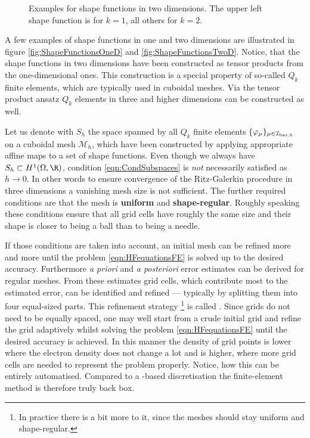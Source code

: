 \begin{figure}
	\centering
	\caption[Examples for shape functions in two dimensions]
	{
		Examples for shape functions in two dimensions.
		The upper left shape function is for $k=1$,
		all others for $k=2$.
	}
	\label{fig:ShapeFunctionsTwoD}
\end{figure}
%
A few examples of shape functions in one and two dimensions are illustrated
in figure \vref{fig:ShapeFunctionsOneD} and \vref{fig:ShapeFunctionsTwoD}.
Notice, that the shape functions in two dimensions
have been constructed as tensor products from the one-dimensional ones.
This construction is a special property of so-called $Q_k$ finite elements,
which are typically used in cuboidal meshes.
Via the tensor product ansatz $Q_k$ elements
in three and higher dimensions can be constructed as well.

Let us denote with $S_h$ the
space spanned by all $Q_k$ finite elements $\{\varphi_\mu\}_{\mu\in\mathcal{I}_{\text{bas},h}}$
on a cuboidal mesh $\mathcal{M}_h$,
which have been constructed by applying
appropriate affine maps to a set of shape functions.
Even though we always have $S_h \subset H^1(\Omega, \R)$,
condition \eqref{eqn:CondSubspaces}
is \emph{not} necessarily satisfied as $h \to 0$.
In other words to ensure convergence
of the Ritz-Galerkin procedure in three dimensions
a vanishing mesh size is not sufficient.
The further required conditions are that the mesh
is \textbf{uniform} and \textbf{shape-regular}.
Roughly speaking these conditions ensure that
all grid cells have roughly the same size
and their shape is closer to being a ball than to being a needle.

If those conditions are taken into account,
an initial mesh can be refined more and more
until the \HF problem \eqref{eqn:HFequationsFE}
is solved up to the desired accuracy.
Furthermore \textit{a priori} and \textit{a posteriori} error estimates
can be derived for regular meshes.
From these estimates grid cells,
which contribute most to the estimated error,
can be identified and refined
--- typically by splitting them into four equal-sized parts.
This refinement strategy%
\footnote{%
In practice there is a bit more to it,
since the meshes should stay uniform and shape-regular.
}
is called .
Since \FE grids do not need to be equally spaced,
one may well start from a crude initial grid
and refine the grid adaptively
whilst solving the problem \eqref{eqn:HFequationsFE}
until the desired accuracy is achieved.
In this manner the density of grid points
is lower where the electron density does not change a lot and is higher,
where more grid cells are needed to represent the problem properly.
Notice, how this can be entirely automatised.
Compared to a \cGTO-based discretisation
the finite-element method is therefore truly back box.

